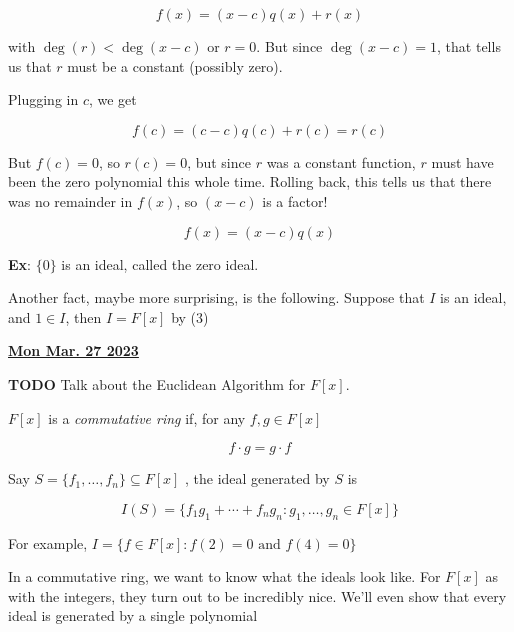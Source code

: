 \documentclass[12pt]{article}
\renewcommand{\date}[1]{\underline{\bf #1}}
\newcommand{\TODO}{\color{red}\textbf{TODO}\color{black}}
\begin{document}
  \[
    f(x) = (x - c) q(x) + r(x)
  \]

  with $\deg(r) < \deg(x - c)$ or $r = 0$. But since $\deg(x - c) = 1$, that
  tells us that $r$ must be a constant (possibly zero).

  Plugging in $c$, we get

  \[
    f(c) = (c - c) q(c) + r(c) = r(c)
  \]

  But $f(c) = 0$, so $r(c) = 0$, but since $r$ was a constant function, $r$ must
  have been the zero polynomial this whole time. Rolling back, this tells us
  that there was no remainder in $f(x)$, so $(x - c)$ is a factor!

  \[
    f(x) = (x - c) q(x)
  \]


  {\bf Ex}: $\{0\}$ is an ideal, called the zero ideal.

  Another fact, maybe more surprising, is the following. Suppose that $I$ is an
  ideal, and $1 \in I$, then $I = F[x]$ by (3)
  

  \date{Mon Mar. 27 2023}

  \TODO{} Talk about the Euclidean Algorithm for $F[x]$.

  $F[x]$ is a {\it commutative ring} if, for any $f, g \in F[x]$

  \[
    f \cdot g = g \cdot f
  \]

  Say $S = \{f_1, \dots, f_n\} \subseteq F[x]$ , the ideal generated by $S$ is

  \[
    I(S) = \{f_1 g_1 + \cdots + f_n g_n : g_1, \dots, g_n \in F[x] \}
  \]

  For example, $I = \{f \in F[x] : f(2) = 0 \text{ and } f(4) = 0 \}$

  In a commutative ring, we want to know what the ideals look like. For $F[x]$
  as with the integers, they turn out to be incredibly nice. We'll even show
  that every ideal is generated by a single polynomial
\end{document}
